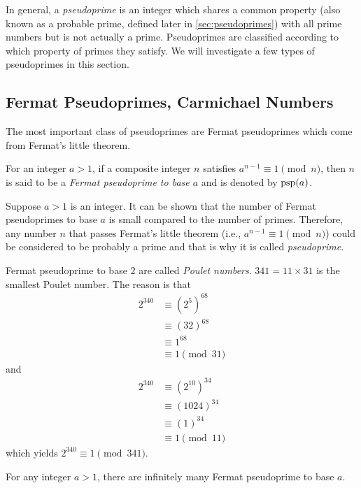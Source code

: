 \documentclass{subfile}
\begin{document}
In general, a \textit{pseudoprime} is an integer which shares a common property (also known as a probable prime, defined later in \autoref{sec:pseudoprimes}) with all prime numbers but is not actually a prime. Pseudoprimes are classified according to which property of primes they satisfy. We will investigate a few types of pseudoprimes in this section.

\subsection{Fermat Pseudoprimes,  Carmichael Numbers}
	The most important class of pseudoprimes are Fermat pseudoprimes which come from Fermat's little theorem.
		\begin{definition}
			For an integer $a>1$, if a composite integer $n$ satisfies $a^{n-1}\equiv 1\pmod n$, then $n$ is said to be a \textit{Fermat pseudoprime to base $a$} and is denoted by $\operatorname{psp}(a)$.
		\end{definition}
	Suppose $a>1$ is an integer. It can be shown that the number of Fermat pseudoprimes to base $a$ is small compared to the number of primes. Therefore, any number $n$ that passes Fermat's little theorem (i.e., $a^{n-1} \equiv 1 \pmod n$) could be considered to be probably a prime and that is why it is called \textit{pseudoprime}.

		\begin{example}
			Fermat pseudoprime to base $2$ are called \textit{Poulet numbers}. $341=11\times 31$ is the smallest Poulet number. The reason is that
				\begin{align*}
					2^{340}
						& \equiv \left(2^5\right)^{68}\\
						& \equiv (32)^{68}\\
						& \equiv 1^{68}\\
						& \equiv 1 \pmod{31}
				\end{align*}
			and
				\begin{align*}
					2^{340}
						& \equiv \left(2^{10}\right)^{34}\\
						& \equiv (1024)^{34}\\
						& \equiv (1)^{34}\\
						& \equiv 1 \pmod{11}
				\end{align*}
			which yields $2^{340} \equiv 1 \pmod{341}$.
		\end{example}


		\begin{theorem}
			For any integer $a>1$, there are infinitely many Fermat pseudoprime to base $a$.
		\end{theorem}
\end{document}
